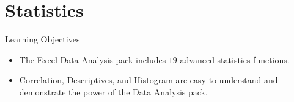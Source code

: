 %
%
%
%
%
%
%
%
%
%
%
%
%
%
%			
%			

\section{Statistics}

\begin{center}
	\begin{objbox}{Learning Objectives}
		\begin{itemize}
			\setlength{\itemsep}{0pt}
			\setlength{\parskip}{0pt}
			\setlength{\parsep}{0pt}
			
			\item The Excel Data Analysis pack includes $ 19 $ advanced statistics functions.
			\item Correlation, Descriptives, and Histogram are easy to understand and demonstrate the power of the Data Analysis pack.
			
		\end{itemize}
	\end{objbox}
\end{center}

